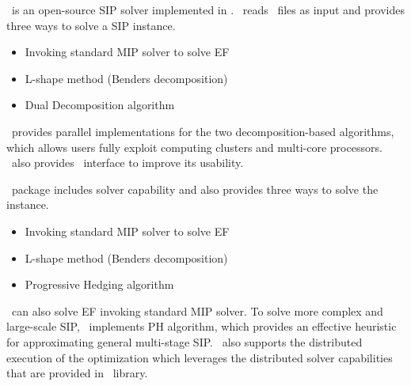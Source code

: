 \dsp\ is an open-source SIP solver implemented in \cpp. \dsp\ reads \smps\ files as input and provides three ways to solve a SIP instance.
\begin{itemize}
	\item Invoking standard MIP solver to solve EF
	\item L-shape method (Benders decomposition)
	\item Dual Decomposition algorithm
\end{itemize}
\dsp\ provides parallel implementations for the two decomposition-based algorithms, which allows users fully exploit computing clusters and multi-core processors. \dsp\ also provides \julia\ interface to improve its usability.

\pysp\ package includes solver capability and also provides three ways to solve the instance. 
\begin{itemize}
	\item Invoking standard MIP solver to solve EF
	\item L-shape method (Benders decomposition)
	\item Progressive Hedging algorithm
\end{itemize}
\pysp\ can also solve EF invoking standard MIP solver. To solve more complex and large-scale SIP, \pysp\ implements PH algorithm, which provides an effective heuristic for approximating general multi-stage SIP.  \pysp\ also supports the distributed execution of the optimization which leverages the distributed solver capabilities that are provided in \pyomo\ library.



